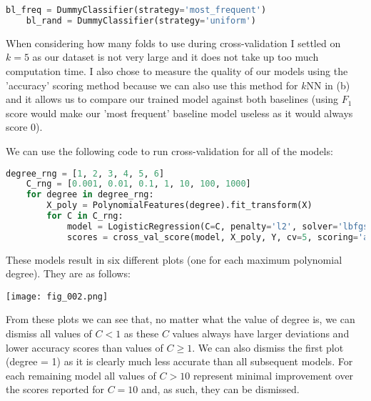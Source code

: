\documentclass[12pt]{article}
\begin{document}
\begin{center}
    \lstset{basicstyle=\footnotesize}
    \begin{lstlisting}[language=Python]
    bl_freq = DummyClassifier(strategy='most_frequent')
    bl_rand = DummyClassifier(strategy='uniform')
    \end{lstlisting}
\end{center}

When considering how many folds to use during cross-validation I settled on $k = 5$ as our dataset is not very large and it does not take up too much computation time. I also chose to measure the quality of our models using the 'accuracy' scoring method because we can also use this method for $k$NN in (b) and it allows us to compare our trained model against both baselines (using $F_1$ score would make our 'most frequent' baseline model useless as it would always score 0).

We can use the following code to run cross-validation for all of the models:

\begin{center}
    \lstset{basicstyle=\footnotesize}
    \begin{lstlisting}[language=Python]
    degree_rng = [1, 2, 3, 4, 5, 6]
    C_rng = [0.001, 0.01, 0.1, 1, 10, 100, 1000]
    for degree in degree_rng:
        X_poly = PolynomialFeatures(degree).fit_transform(X)
        for C in C_rng:
            model = LogisticRegression(C=C, penalty='l2', solver='lbfgs').fit(X_poly, Y)
            scores = cross_val_score(model, X_poly, Y, cv=5, scoring='accuracy')
    \end{lstlisting}
\end{center}

These models result in six different plots (one for each maximum polynomial degree). They are as follows:

\begin{center}
    \texttt{[image: fig\_002.png]}
\end{center}

From these plots we can see that, no matter what the value of degree is, we can dismiss all values of $C < 1$ as these $C$ values always have larger deviations and lower accuracy scores than values of $C \ge 1$. We can also dismiss the first plot (degree = 1) as it is clearly much less accurate than all subsequent models. For each remaining model all values of $C > 10$ represent minimal improvement over the scores reported for $C = 10$ and, as such, they can be dismissed.
\end{document}
